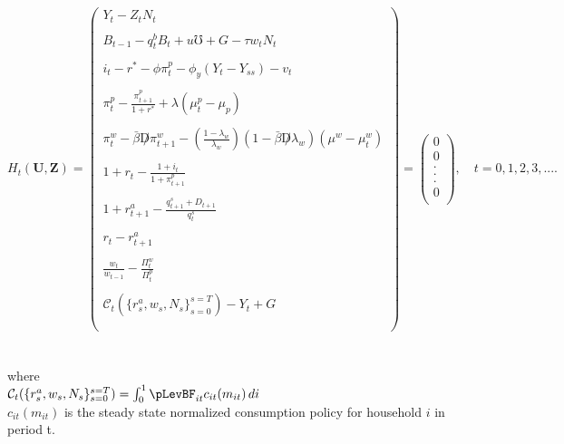 \documentclass[titlepage]{\econtex}\providecommand{\texname}{BufferStockTheory}
\begin{document}
$$
H_{t}(\mathbf{U},\mathbf{Z})= \begin{pmatrix} 
 Y_{t} - Z_{t}N_{t} \\ \\ 
B_{t-1} - q^{b}_{t}B_{t} + u\mho + G - \tau w_{t} N_{t} \\ \\  
i_{t} - r^{*} - \phi \pi^{p}_{t} -\phi_{y}(Y_{t}-Y_{ss}) - v_{t} \\ \\
\pi_{t}^{p} -\frac{\pi^{p}_{t+1}}{1+r^{*}} + \lambda(\mu_{t}^{p} -\mu_{p})  \\ \\
 \pi_{t}^{w} -\bar{\beta} \not D \pi_{t+1}^{w} -(\frac{1- \lambda_{w}}{\lambda_{w}}) (1- \bar{\beta}\not D \lambda_{w}) (\mu^{w} -\mu_{t}^{w}) \\ \\
    1+r_{t} - \frac{1 + i_{t}}{1+ \pi^{p}_{t+1}}\\ \\
 1+r_{t+1}^{a} - \frac{q_{t+1}^{s} +D_{t+1}}{q_{t}^{s}} \\ \\
 r_{t} - r_{t+1}^{a} \\ \\
 \frac{w_{t}}{w_{t-1}} - \frac{\Pi_{t}^{w}}{\Pi_{t}^{p}} \\ \\
 \mathcal{C}_{t}(\{r_{s}^{a} ,w_{s}, N_{s}\}_{s=0}^{s=T}) - Y_{t} + G \\ \\
 \end{pmatrix} = \begin{pmatrix} 0 \\ 0 \\. \\. \\. \\ 0\\ \end{pmatrix} , \quad t=0,1 ,2,3,....
$$ \\ \\
 

 
 where \\
 
$\mathcal{C}_{t}(\{r_{s}^{a} ,w_{s}, N_{s}\}_{s=0}^{s=T}) = \int_{0}^{1} \pLevBF_{it} c_{it}(m_{it})\, di $ \\
 
$c_{it}(m_{it})$ is the steady state normalized consumption policy for household $i$ in period t. \\ \\
 
\end{document}
